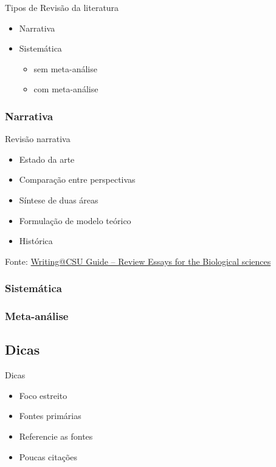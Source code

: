 \documentclass{beamer}
\begin{document}
\begin{frame}{Tipos de Revisão da literatura}
  \begin{itemize}
    \footnotesize
  \item Narrativa
    \bigskip
  \item Sistemática
    \begin{itemize}
      \scriptsize
      \medskip
    \item sem meta-análise
      \smallskip
    \item com meta-análise
    \end{itemize}
  \end{itemize}
\end{frame}

\subsubsection{Narrativa}

\begin{frame}{Revisão narrativa}
  \begin{itemize}
    \scriptsize
  \item Estado da arte
    \bigskip
  \item Comparação entre perspectivas
    \bigskip
  \item Síntese de duas áreas
    \bigskip
  \item Formulação de modelo teórico
    \bigskip
  \item Histórica
  \end{itemize}

  \vfill
  \scriptsize
  \hfill Fonte: \href{https://writing.colostate.edu/guides/guide.cfm?guideid=79}
  {\tiny Writing@CSU Guide -- Review Essays for the Biological sciences}
\end{frame}

\subsubsection{Sistemática}

\subsubsection{Meta-análise}

\subsection{Dicas}

\begin{frame}{Dicas}
  \begin{itemize}
    \footnotesize
  \item Foco estreito
    \bigskip
  \item Fontes primárias
    \bigskip
  \item Referencie as fontes
    \bigskip
  \item Poucas citações
  \end{itemize}
\end{frame}
\end{document}
